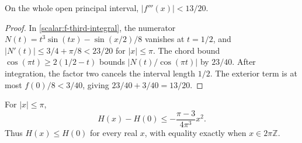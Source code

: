 \begin{corollary}
\label{scalar:third-absolute}
On the whole open principal interval, $|f'''(x)|<13/20$.
\end{corollary}

\begin{proof}
In \eqref{scalar:f-third-integral}, the numerator
$N(t)=t^3\sin(tx)-\sin(x/2)/8$ vanishes at $t=1/2$, and
$|N'(t)|\leq3/4+\pi/8<23/20$ for $|x|\leq\pi$.
The chord bound $\cos(\pi t)\geq2(1/2-t)$ bounds
$|N(t)/\cos(\pi t)|$ by $23/40$.  After integration, the factor
two cancels the interval length $1/2$.  The exterior term is at most
$f(0)/8<3/40$, giving $23/40+3/40=13/20$.
\end{proof}

\begin{proposition}
\label{scalar:H-maximum}
For $|x|\leq\pi$,
\begin{equation}\label{scalar:H-drop}
 H(x)-H(0)\leq-\frac{\pi-3}{4\pi^3}x^2.
\end{equation}
Thus $H(x)\leq H(0)$ for every real $x$, with equality exactly when
$x\in2\pi\mathbb Z$.
\end{proposition}

